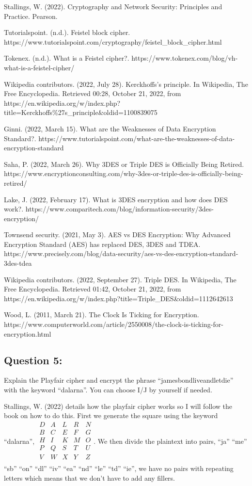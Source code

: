 \documentclass[11pt]{article}
\begin{document}
Stallings, W. (2022). Cryptography and Network Security: Principles and
Practice. Pearson.

Tutorialspoint. (n.d.). Feistel block cipher.
https://www.tutorialspoint.com/cryptography/feistel\_block\_cipher.html

Tokenex. (n.d.). What is a Feistel cipher?.
https://www.tokenex.com/blog/vh-what-is-a-feistel-cipher/

Wikipedia contributors. (2022, July 28). Kerckhoffs's principle. In
Wikipedia, The Free Encyclopedia. Retrieved 00:28, October 21, 2022,
from
https://en.wikipedia.org/w/index.php?title=Kerckhoffs\%27s\_principle\&oldid=1100839075

Ginni. (2022, March 15). What are the Weaknesses of Data Encryption
Standard?.
https://www.tutorialspoint.com/what-are-the-weaknesses-of-data-encryption-standard

Saha, P. (2022, March 26). Why 3DES or Triple DES is Officially Being
Retired.
https://www.encryptionconsulting.com/why-3des-or-triple-des-is-officially-being-retired/

Lake, J. (2022, February 17). What is 3DES encryption and how does DES
work?.
https://www.comparitech.com/blog/information-security/3des-encryption/

Townsend security. (2021, May 3). AES vs DES Encryption: Why Advanced
Encryption Standard (AES) has replaced DES, 3DES and TDEA.
https://www.precisely.com/blog/data-security/aes-vs-des-encryption-standard-3des-tdea

Wikipedia contributors. (2022, September 27). Triple DES. In Wikipedia,
The Free Encyclopedia. Retrieved 01:42, October 21, 2022, from
https://en.wikipedia.org/w/index.php?title=Triple\_DES\&oldid=1112642613

Wood, L. (2011, March 21). The Clock Is Ticking for Encryption.
https://www.computerworld.com/article/2550008/the-clock-is-ticking-for-encryption.html

    \hypertarget{question-5}{%
\subsection{Question 5:}\label{question-5}}

Explain the Playfair cipher and encrypt the phrase
``jamesbondliveandletdie'' with the keyword ``dalarna''. You can choose
I/J by yourself if needed.

    Stallings, W. (2022) details how the playfair cipher works so I will
follow the book on how to do this. First we generate the square using
the keyword ``dalarna'',
\(\begin{matrix}D & A & L & R & N\\B & C & E & F & G\\H & I & K & M & O\\P & Q & S & T & U\\V & W & X & Y & Z\\\end{matrix}\).
We then divide the plaintext into pairs, ``ja'' ``me'' ``sb'' ``on''
``dl'' ``iv'' ``ea'' ``nd'' ``le'' ``td'' ``ie'', we have no pairs with
repeating letters which means that we don't have to add any fillers.
\end{document}
